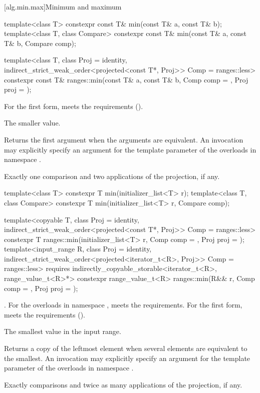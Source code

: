 [alg.min.max]{Minimum and maximum}

%
\begin{itemdecl}
template<class T>
  constexpr const T& min(const T& a, const T& b);
template<class T, class Compare>
  constexpr const T& min(const T& a, const T& b, Compare comp);

template<class T, class Proj = identity,
         indirect_strict_weak_order<projected<const T*, Proj>> Comp = ranges::less>
  constexpr const T& ranges::min(const T& a, const T& b, Comp comp = {}, Proj proj = {});
\end{itemdecl}

\begin{itemdescr}
\pnum
\expects
For the first form,  meets the
 requirements ().

\pnum
\returns
The smaller value.

\pnum
\remarks
Returns the first argument when the arguments are equivalent.
An invocation may explicitly specify
an argument for the template parameter 
of the overloads in namespace .

\pnum
\complexity
Exactly one comparison and two applications of the projection, if any.
\end{itemdescr}

%
\begin{itemdecl}
template<class T>
  constexpr T min(initializer_list<T> r);
template<class T, class Compare>
  constexpr T min(initializer_list<T> r, Compare comp);

template<copyable T, class Proj = identity,
         indirect_strict_weak_order<projected<const T*, Proj>> Comp = ranges::less>
  constexpr T ranges::min(initializer_list<T> r, Comp comp = {}, Proj proj = {});
template<input_range R, class Proj = identity,
         indirect_strict_weak_order<projected<iterator_t<R>, Proj>> Comp = ranges::less>
  requires indirectly_copyable_storable<iterator_t<R>, range_value_t<R>*>
  constexpr range_value_t<R>
    ranges::min(R&& r, Comp comp = {}, Proj proj = {});
\end{itemdecl}

\begin{itemdescr}
\pnum
\expects
{}.
For the overloads in namespace ,
 meets the  requirements.
For the first form,  meets the 
requirements ().

\pnum
\returns
The smallest value in the input range.

\pnum
\remarks
Returns a copy of the leftmost element
when several elements are equivalent to the smallest.
An invocation may explicitly specify
an argument for the template parameter 
of the overloads in namespace .

\pnum
\complexity
Exactly  comparisons
and twice as many applications of the projection, if any.
\end{itemdescr}

